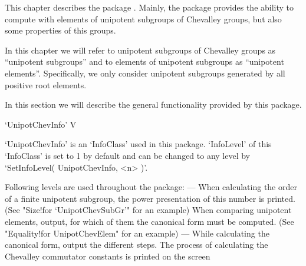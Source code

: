 

This  chapter  describes  the  package  {\Unipot}.  Mainly,  the  package
provides the ability to compute  with  elements of unipotent subgroups of
Chevalley groups, but also some properties of this groups.


In this chapter we will refer to unipotent subgroups of Chevalley  groups
as ``unipotent  subgroups'' and  to elements  of unipotent  subgroups  as
``unipotent   elements''.  Specifically,   we  only  consider   unipotent
subgroups generated by all positive root elements.



In this section we  will  describe the  general functionality provided by
this package.

\>`UnipotChevInfo'  V

`UnipotChevInfo'  is an `InfoClass' used  in this package. `InfoLevel' of
this `InfoClass' is set to  1 by default and can be changed to  any level
by `SetInfoLevel( UnipotChevInfo, <n> )'.

Following levels are used throughout the package:
\beginlist
{}%
    ---
    When calculating the order of a finite unipotent subgroup,  the power
    presentation of this number is printed.
    (See "Size!for `UnipotChevSubGr'" for an example)
    When  comparing  unipotent  elements,  output,  for which of them the
    canonical form must be computed.
    (See "Equality!for UnipotChevElem" for an example)
    ---
    While calculating the canonical form, output the different steps.
    The  process  of  calculating  the  Chevalley commutator constants is
    printed on the screen
\endlist






